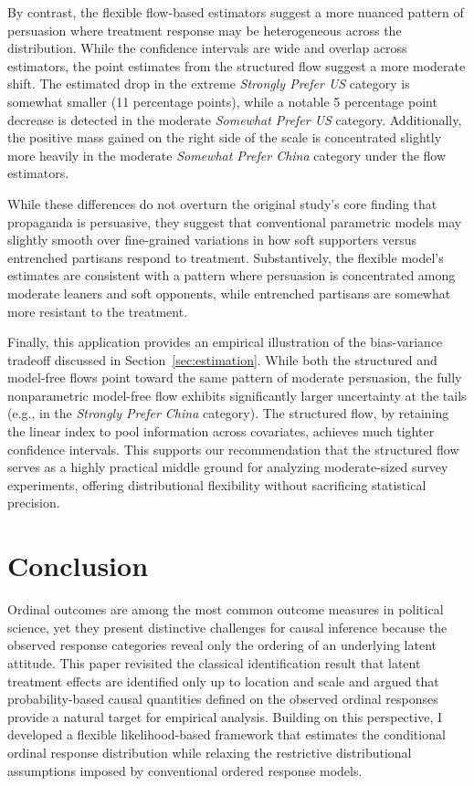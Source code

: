 \documentclass{article}
\begin{document}
By contrast, the flexible flow-based estimators suggest a more nuanced pattern of persuasion where treatment response may be heterogeneous across the distribution. While the confidence intervals are wide and overlap across estimators, the point estimates from the structured flow suggest a more moderate shift. The estimated drop in the extreme \emph{Strongly Prefer US} category is somewhat smaller (11 percentage points), while a notable 5 percentage point decrease is detected in the moderate \emph{Somewhat Prefer US} category. Additionally, the positive mass gained on the right side of the scale is concentrated slightly more heavily in the moderate \emph{Somewhat Prefer China} category under the flow estimators. 

While these differences do not overturn the original study's core finding that propaganda is persuasive, they suggest that conventional parametric models may slightly smooth over fine-grained variations in how soft supporters versus entrenched partisans respond to treatment. Substantively, the flexible model's estimates are consistent with a pattern where persuasion is concentrated among moderate leaners and soft opponents, while entrenched partisans are somewhat more resistant to the treatment.

Finally, this application provides an empirical illustration of the bias-variance tradeoff discussed in Section~\ref{sec:estimation}. While both the structured and model-free flows point toward the same pattern of moderate persuasion, the fully nonparametric model-free flow exhibits significantly larger uncertainty at the tails (e.g., in the \emph{Strongly Prefer China} category). The structured flow, by retaining the linear index to pool information across covariates, achieves much tighter confidence intervals. This supports our recommendation that the structured flow serves as a highly practical middle ground for analyzing moderate-sized survey experiments, offering distributional flexibility without sacrificing statistical precision.

\section{Conclusion}
\label{sec:conclusion}

Ordinal outcomes are among the most common outcome measures in political science, yet they present distinctive challenges for causal inference because the observed response categories reveal only the ordering of an underlying latent attitude. This paper revisited the classical identification result that latent treatment effects are identified only up to location and scale and argued that probability-based causal quantities defined on the observed ordinal responses provide a natural target for empirical analysis. Building on this perspective, I developed a flexible likelihood-based framework that estimates the conditional ordinal response distribution while relaxing the restrictive distributional assumptions imposed by conventional ordered response models.
\end{document}
